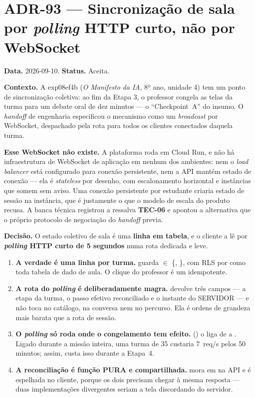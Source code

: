 \section{ADR-93 --- Sincronização de sala por \emph{polling} HTTP curto, não por WebSocket}

\textbf{Data.} 2026-09-10. \textbf{Status.} Aceita.

\textbf{Contexto.} A exp08ef4b (\emph{O Manifesto da IA}, 8º ano, unidade 4) tem um
ponto de sincronização coletiva: ao fim da Etapa 3, o professor congela as telas
da turma para um debate oral de dez minutos --- o \enquote{Checkpoint~A} do
insumo. O \emph{handoff} de engenharia especificou o mecanismo como um
\emph{broadcast}  por WebSocket, despachado pela rota
 para todos os clientes
conectados daquela turma.

\textbf{Esse WebSocket não existe.} A plataforma roda em Cloud Run, e não há
infraestrutura de WebSocket de aplicação em nenhum dos ambientes: nem o
\emph{load balancer} está configurado para conexão persistente, nem a API mantém
estado de conexão --- ela é \emph{stateless} por desenho, com escalonamento
horizontal e instâncias que somem sem aviso. Uma conexão persistente por
estudante criaria estado de sessão na instância, que é justamente o que o
modelo de escala do produto recusa. A banca técnica registrou a ressalva
\textbf{TEC-06} e apontou a alternativa que o próprio protocolo de negociação do
\emph{handoff} previa.

\textbf{Decisão.} O estado coletivo de sala é uma \textbf{linha em tabela}, e o
cliente a lê por \textbf{\emph{polling} HTTP curto de 5 segundos} numa rota
dedicada e leve.

\begin{enumerate}
  \item \textbf{A verdade é uma linha por turma.} 
    guarda  $\in$ \{, \}, com RLS por
     como toda tabela de dado de aula. O clique do professor é um
     idempotente.
  \item \textbf{A rota do \emph{polling} é deliberadamente magra.}
     devolve três campos --- a etapa da turma, o
    passo efetivo reconciliado e o instante do SERVIDOR --- e não toca no
    catálogo, na conversa nem no percurso. Ela é ordens de grandeza mais barata
    que a rota de sessão.
  \item \textbf{O \emph{polling} só roda onde o congelamento tem efeito.}
     () o liga de
     a . Ligado durante a missão inteira, uma turma de
    35 custaria 7~req/s pelos 50 minutos; assim, custa isso durante a Etapa~4.
  \item \textbf{A reconciliação é função PURA e compartilhada.}
     mora em  na API e é
    espelhada no cliente, porque os dois precisam chegar à mesma resposta ---
    duas implementações divergentes seriam a tela discordando do servidor.
\end{enumerate}

